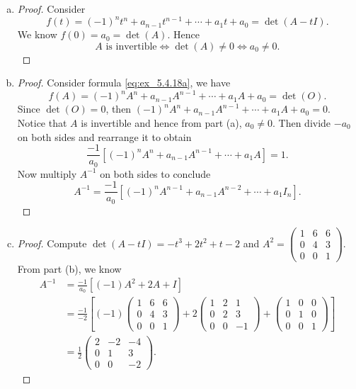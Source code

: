 \begin{Exercise}
\begin{enumerate}[(a)]
\item
\begin{proof}
Consider
\begin{equation}\label{eq:ex_5.4.18a}
f(t) = (-1)^n t^n + a_{n-1} t^{n-1} + \cdots + a_1 t + a_0 = \det(A-t I).
\end{equation}
We know $f(0) = a_0 = \det(A)$. Hence
$$
A\text{ is invertible} \iff \det(A)\neq 0 \iff a_0 \neq 0.
$$
\end{proof}

\item
\begin{proof}
Consider formula \eqref{eq:ex_5.4.18a}, we have
$$
f(A) = (-1)^n A^n + a_{n-1} A^{n-1} + \cdots + a_1 A + a_0 = \det(O).
$$
Since $\det(O) = 0$, then $(-1)^n A^n + a_{n-1} A^{n-1} + \cdots + a_1 A + a_0 = 0$. Notice that $A$ is invertible and hence from part (a), $a_0\neq 0$. Then divide $-a_0$ on both sides and rearrange it to obtain
$$
\frac{-1}{a_0}\left[ (-1)^n A^n + a_{n-1} A^{n-1} + \cdots + a_1 A \right] = 1.
$$
Now multiply $A^{-1}$ on both sides to conclude
$$
A^{-1} = \frac{-1}{a_0}\left[ (-1)^n A^{n-1} + a_{n-1} A^{n-2} + \cdots + a_1 I_n \right].
$$
\end{proof}

\item
\begin{proof}
Compute $\det(A-t I) = -t^3+2 t^2+t-2$ and $A^2 = \begin{pmatrix}
1 & 6 & 6 \\
0 & 4 & 3 \\
0 & 0 & 1
\end{pmatrix}$.
From part (b), we know
\begin{align*}
A^{-1} 
&= \frac{-1}{a_0}\left[ (-1)A^2 + 2A + I \right] \\
&= \frac{-1}{-2} \left[ (-1)\begin{pmatrix}
1 & 6 & 6 \\
0 & 4 & 3 \\
0 & 0 & 1
\end{pmatrix} + 2\begin{pmatrix}
1 & 2 & 1 \\
0 & 2 & 3 \\
0 & 0 & -1
\end{pmatrix} + \begin{pmatrix}
1 & 0 & 0 \\
0 & 1 & 0 \\
0 & 0 & 1
\end{pmatrix} \right] \\
&= \frac{1}{2}\begin{pmatrix}
2 & -2 & -4 \\
0 & 1 & 3 \\
0 & 0 & -2
\end{pmatrix}.
\end{align*}
\end{proof}
\end{enumerate}
\end{Exercise}